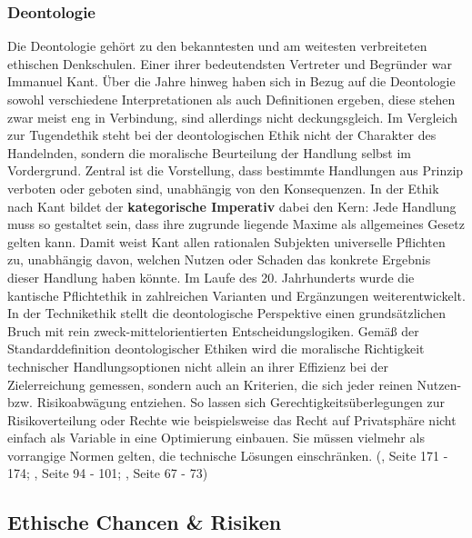 \subsubsection{Deontologie}
Die Deontologie gehört zu den bekanntesten und am weitesten verbreiteten ethischen Denkschulen. Einer ihrer bedeutendsten Vertreter und Begründer war Immanuel Kant. Über die Jahre hinweg haben sich in Bezug auf die Deontologie sowohl verschiedene Interpretationen als auch Definitionen ergeben, diese stehen zwar meist eng in Verbindung, sind allerdings nicht deckungsgleich. Im Vergleich zur Tugendethik steht bei der deontologischen Ethik nicht der Charakter des Handelnden, sondern die moralische Beurteilung der Handlung selbst im Vordergrund. Zentral ist die Vorstellung, dass bestimmte Handlungen aus Prinzip verboten oder geboten sind, unabhängig von den Konsequenzen. In der Ethik nach Kant bildet der \textbf{kategorische Imperativ} dabei den Kern: Jede Handlung muss so gestaltet sein, dass ihre zugrunde liegende Maxime als allgemeines Gesetz gelten kann. Damit weist Kant allen rationalen Subjekten universelle Pflichten zu, unabhängig davon, welchen Nutzen oder Schaden das konkrete Ergebnis dieser Handlung haben könnte. Im Laufe des 20. Jahrhunderts wurde die kantische Pflichtethik in zahlreichen Varianten und Ergänzungen weiterentwickelt. In der Technikethik stellt die deontologische Perspektive einen grundsätzlichen Bruch mit rein zweck-mittelorientierten Entscheidungslogiken. Gemäß der Standarddefinition deontologischer Ethiken wird die moralische Richtigkeit technischer Handlungsoptionen nicht allein an ihrer Effizienz bei der Zielerreichung gemessen, sondern auch an Kriterien, die sich jeder reinen Nutzen- bzw. Risikoabwägung entziehen. So lassen sich Gerechtigkeitsüberlegungen zur Risikoverteilung oder Rechte wie beispielsweise das Recht auf Privatsphäre nicht einfach als Variable in eine Optimierung einbauen. Sie müssen vielmehr als vorrangige Normen gelten, die technische Lösungen einschränken. (\cite{grunwaldHandbuchTechnikethik2021}, Seite 171 - 174; \cite{plegerGuteLebenEinfuehrung2017}, Seite 94 - 101; \cite{neuhaeuserHandbuchAngewandteEthik2023}, Seite 67 - 73)

\subsection{Ethische Chancen \& Risiken}

